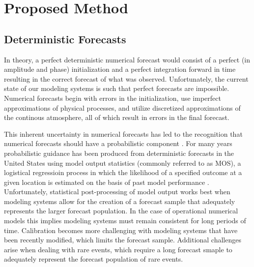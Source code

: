 

\chapter{Proposed Method}
\label{method}


\section{Deterministic Forecasts}
\label{dmethod}

In theory, a perfect deterministic numerical forecast would consist of a perfect (in amplitude and phase) initialization and a perfect integration forward in time resulting in the correct forecast of what was observed. Unfortunately, the current state of our modeling systems is such that perfect forecasts are impossible. Numerical forecasts begin with errors in the initialization, use imperfect approximations of physical processes, and utilize discretized approximations of the continous atmosphere, all of which result in errors in the final forecast.

This inherent uncertainty in numerical forecasts has led to the recognition that numerical forecasts should have a probabilistic component \citep{ADD}. For many years probabilistic guidance has been produced from deterministic forecasts in the United States using model output statistics (commonly referred to as MOS), a logistical regressioin process in which the likelihood of a specified outcome at a given location is estimated on the basis of past model performance \citep{Glahn1972}. Unfortunately, statistical post-processing of model output works best when modeling systems allow for the creation of a forecast sample that adequately represents the larger forecast population. In the case of operational numerical models this implies modeling systems must remain consistent for long periods of time. Calibration becomes more challenging with modeling systems that have been recently modified, which limits the forecast sample. Additional challenges arise when dealing with rare events, which require a long forecast smaple to adequately represent the forecast population of rare events.


